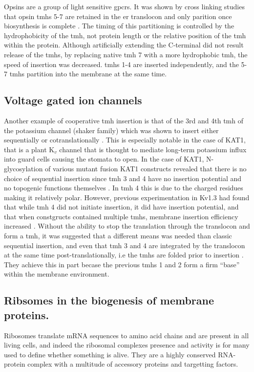 Opsins are a group of light sensitive \gls{gpcr}s.
It was shown by cross linking studies that opsin \gls{tmh}s 5-7 are retained in the \gls{er} translocon and only parition once biosynthesis is complete \cite{Ismail2008}.
The timing of this partitioning is controlled by the hydrophobicity of the \gls{tmh}, not protein length or the relative position of the \gls{tmh} within the protein.
Although artificially extending the C-terminal did not result release of the \gls{tmh}s, by replacing native \gls{tmh} 7 with a more hydrophobic \gls{tmh}, the speed of insertion was decreased.
\gls{tmh}s 1-4 are inserted independently, and the 5-7 \gls{tmh}s partition into the membrane at the same time.

\subsection{Voltage gated ion channels}

Another example of cooperative \gls{tmh} insertion is that of the 3rd and 4th \gls{tmh} of the potassium channel (shaker family) which was shown to insert either sequentially or cotranslationally \cite{Zhang2007, Cymer2015}.
This is especially notable in the case of KAT1, that is a plant K$_v$ channel that is thought to mediate long-term potassium influx into guard cells causing the stomata to open.
In the case of KAT1, N-glycosylation of various mutant fusion KAT1 constructs revealed that there is no choice of sequential insertion since \gls{tmh} 3 and 4 have no insertion potential and no topogenic functions themselves \cite{Sato2002, Sato2003}.
In \gls{tmh} 4 this is due to the charged residues making it relatively polar.
However, previous experimentation in Kv1.3 had found that while \gls{tmh} 4 did not initiate insertion, it did have insertion potential, and that when constgructs contained multiple \gls{tmh}s, membrane insertion efficiency increased \cite{Tu2000}.
Without the ability to stop the translation through the translocon and form a \gls{tmh}, it was suggested that a different means was needed than classic sequential insertion, and even that \gls{tmh} 3 and 4 are integrated by the translocon at the same time post-translationally, i.e the \gls{tmh}s are folded prior to insertion \cite{Sato2003}.
They achieve this in part becase the previous \gls{tmh}s 1 and 2 form a firm ``base'' within the membrane environment.



\subsection{Ribsomes in the biogenesis of membrane proteins.}
Ribosomes translate mRNA sequences to amino acid chains and are present in all living cells, and indeed the ribosomal complexes presence and activity is for many used to define whether something is alive.
They are a highly conserved RNA-protein complex with a multitude of accessory proteins and targetting factors.

